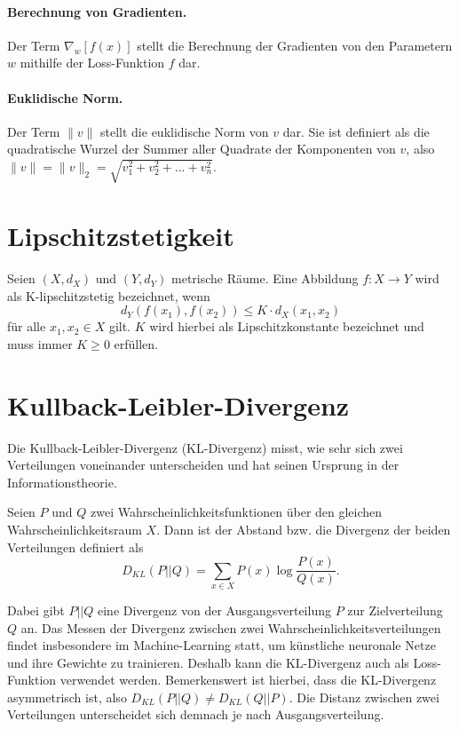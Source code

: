 \paragraph{Berechnung von Gradienten.}
Der Term $\nabla_w\left[f(x)\right]$ stellt die Berechnung der Gradienten von
den Parametern $w$ mithilfe der Loss-Funktion $f$ dar.

\paragraph{Euklidische Norm.}
Der Term $\| v \|$ stellt die euklidische Norm von $v$ dar. Sie ist definiert als die quadratische Wurzel der Summer aller Quadrate der Komponenten von $v$, also $\| v \| = \| v \|_2 = \sqrt{v_1^2 + v_2^2 + ... + v_n^2}$.

\section{Lipschitzstetigkeit}
\begin{definition}[K-Lipschitzstetigkeit]
Seien $(X, d_X)$ und $(Y, d_Y)$ metrische Räume. Eine Abbildung $f: X \to Y$
wird als K-lipschitzstetig bezeichnet, wenn
\[
    d_Y(f(x_1), f(x_2)) \leq K \cdot d_X(x_1, x_2)
\]
für alle $x_1, x_2 \in X$ gilt. $K$ wird hierbei als Lipschitzkonstante
bezeichnet und muss immer $K \geq 0$ erfüllen.
\end{definition}

\section{Kullback-Leibler-Divergenz}
Die Kullback-Leibler-Divergenz (KL-Divergenz) misst, wie sehr sich zwei
Verteilungen voneinander unterscheiden und hat seinen Ursprung in der
Informationstheorie. 
\begin{definition}
Seien $P$ und $Q$ zwei Wahrscheinlichkeitsfunktionen über den gleichen
Wahrscheinlichkeitsraum $X$. Dann ist der Abstand bzw. die Divergenz der
beiden Verteilungen definiert als
\[
    D_{KL}(P \lvert\lvert Q) = \sum_{x \in X} P(x) \log \frac{P(x)}{Q(x)}.
\]
\end{definition}
Dabei gibt $P \lvert\lvert Q$ eine Divergenz von der Ausgangsverteilung $P$
zur Zielverteilung $Q$ an. Das Messen der Divergenz zwischen zwei
Wahrscheinlichkeitsverteilungen findet insbesondere im Machine-Learning statt,
um künstliche neuronale Netze und ihre Gewichte zu trainieren. Deshalb kann
die KL-Divergenz auch als Loss-Funktion verwendet werden. Bemerkenswert ist
hierbei, dass die KL-Divergenz asymmetrisch ist, also $D_{KL}(P \lvert\lvert
Q) \neq D_{KL}(Q \lvert\lvert P)$. Die Distanz zwischen zwei Verteilungen
unterscheidet sich demnach je nach Ausgangsverteilung.

